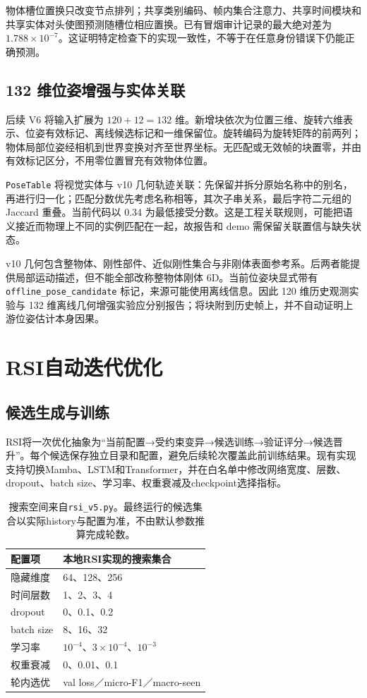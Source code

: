 \documentclass[10pt,twocolumn,letterpaper]{article}
\newcommand{\code}[1]{\texttt{\small #1}}
\begin{document}
物体槽位置换只改变节点排列；共享类别编码、帧内集合注意力、共享时间模块和共享实体对头使图预测随槽位相应置换。已有冒烟审计记录的最大绝对差为 $1.788\times10^{-7}$。这证明特定检查下的实现一致性，不等于在任意身份错误下仍能正确预测。


\subsection{132 维位姿增强与实体关联}
后续 V6 将输入扩展为 $120+12=132$ 维。新增块依次为位置三维、旋转六维表示、位姿有效标记、离线候选标记和一维保留位。旋转编码为旋转矩阵的前两列；物体局部位姿经相机到世界变换对齐至世界坐标。无匹配或无效帧的块置零，并由有效标记区分，不用零位置冒充有效物体位置。

\code{PoseTable} 将视觉实体与 v10 几何轨迹关联：先保留并拆分原始名称中的别名，再进行归一化；匹配分数优先考虑名称相等，其次子串关系，最后字符二元组的 Jaccard 重叠。当前代码以 0.34 为最低接受分数。这是工程关联规则，可能把语义接近而物理上不同的实例匹配在一起，故报告和 demo 需保留关联置信与缺失状态。

v10 几何包含整物体、刚性部件、近似刚性集合与非刚体表面参考系。后两者能提供局部运动描述，但不能全部改称整物体刚体 6D。当前位姿块显式带有 \code{offline\_pose\_candidate} 标记，来源可能使用离线信息。因此 120 维历史观测实验与 132 维离线几何增强实验应分别报告；将块附到历史帧上，并不自动证明上游位姿估计本身因果。

\section{RSI自动迭代优化}
\subsection{候选生成与训练}
RSI将一次优化抽象为“当前配置→受约束变异→候选训练→验证评分→候选晋升”。每个候选保存独立目录和配置，避免后续轮次覆盖此前训练结果。现有实现支持切换Mamba、LSTM和Transformer，并在白名单中修改网络宽度、层数、dropout、batch size、学习率、权重衰减及checkpoint选择指标。

\begin{table}[t]
\centering\small
\begin{tabular}{ll}
\toprule 配置项 & 本地RSI实现的搜索集合\\\midrule
隐藏维度 & 64、128、256\\
时间层数 & 1、2、3、4\\
dropout & 0、0.1、0.2\\
batch size & 8、16、32\\
学习率 & $10^{-4}$、$3\times10^{-4}$、$10^{-3}$\\
权重衰减 & 0、0.01、0.1\\
轮内选优 & val loss／micro-F1／macro-seen\\
\bottomrule
\end{tabular}
\caption{搜索空间来自\texttt{rsi\_v5.py}。最终运行的候选集合以实际history与配置为准，不由默认参数推算完成轮数。}
\end{table}
\end{document}
